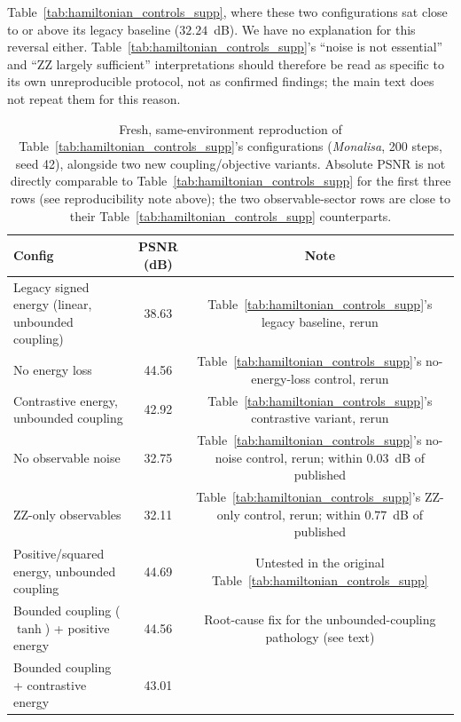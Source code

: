 \documentclass[11pt]{article}
\begin{document}
Table~\ref{tab:hamiltonian_controls_supp}, where these two configurations sat close to or above its legacy baseline ($32.24$~dB). We have no explanation for this reversal either. Table~\ref{tab:hamiltonian_controls_supp}'s ``noise is not essential'' and ``ZZ largely sufficient'' interpretations should therefore be read as specific to its own unreproducible protocol, not as confirmed findings; the main text does not repeat them for this reason.

\begin{table}[H]
\centering
\caption{Fresh, same-environment reproduction of Table~\ref{tab:hamiltonian_controls_supp}'s configurations (\textit{Monalisa}, 200 steps, seed 42), alongside two new coupling/objective variants. Absolute PSNR is not directly comparable to Table~\ref{tab:hamiltonian_controls_supp} for the first three rows (see reproducibility note above); the two observable-sector rows are close to their Table~\ref{tab:hamiltonian_controls_supp} counterparts.}
\label{tab:hamiltonian_reproducibility}
\scriptsize
\begin{tabular}{lcc}
\toprule
Config & PSNR (dB) & Note \\
\midrule
Legacy signed energy (linear, unbounded coupling) & 38.63 & Table~\ref{tab:hamiltonian_controls_supp}'s legacy baseline, rerun \\
No energy loss & 44.56 & Table~\ref{tab:hamiltonian_controls_supp}'s no-energy-loss control, rerun \\
Contrastive energy, unbounded coupling & 42.92 & Table~\ref{tab:hamiltonian_controls_supp}'s contrastive variant, rerun \\
No observable noise & 32.75 & Table~\ref{tab:hamiltonian_controls_supp}'s no-noise control, rerun; within $0.03$~dB of published \\
ZZ-only observables & 32.11 & Table~\ref{tab:hamiltonian_controls_supp}'s ZZ-only control, rerun; within $0.77$~dB of published \\
Positive/squared energy, unbounded coupling & 44.69 & Untested in the original Table~\ref{tab:hamiltonian_controls_supp} \\
Bounded coupling ($\tanh$) + positive energy & 44.56 & Root-cause fix for the unbounded-coupling pathology (see text) \\
Bounded coupling + contrastive energy & 43.01 & \\
\bottomrule
\end{tabular}
\end{table}
\end{document}
